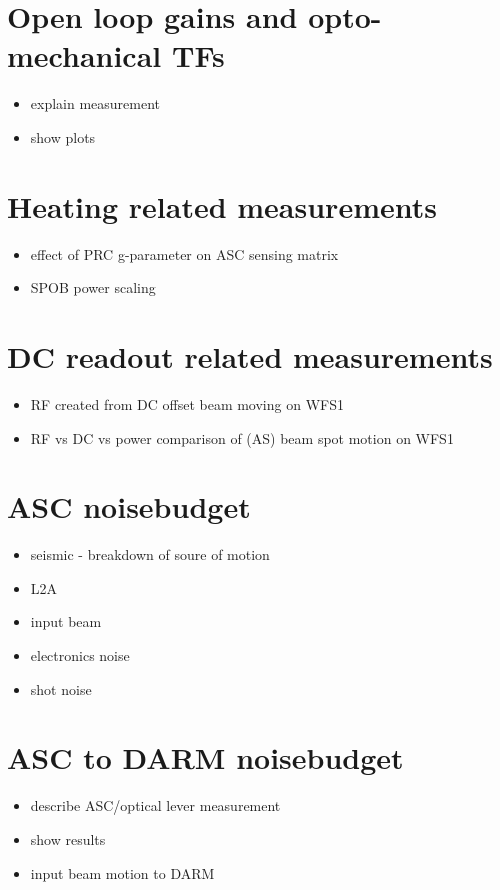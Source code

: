 \section{Open loop gains and opto-mechanical TFs}
\begin{itemize}
\item explain measurement
\item show plots
\end{itemize}

\section{Heating related measurements}
\begin{itemize} 
\item effect of PRC g-parameter on ASC sensing matrix
\item SPOB power scaling
\end{itemize}

\section{DC readout related measurements}
\begin{itemize}
\item RF created from DC offset beam moving on WFS1
\item RF vs DC vs power comparison of (AS) beam spot motion on WFS1
\end{itemize}

\section{ASC noisebudget}
\begin{itemize}
\item seismic - breakdown of soure of motion
\item L2A
\item input beam 
\item electronics noise
\item shot noise
\end{itemize}

\section{ASC to DARM noisebudget}
\begin{itemize} 
\item describe ASC/optical lever measurement
\item show results
\item input beam motion to DARM
\end{itemize}

